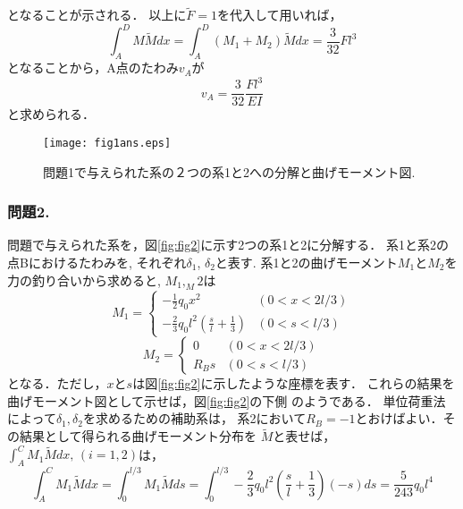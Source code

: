 \documentclass[10pt,a4j]{jarticle}
\begin{document}
となることが示される．
以上に$\tilde F=1$を代入して用いれば，
\begin{equation}
	\int_A^D M\tilde M dx
	=
	\int_A^D (M_1+M_2) \tilde M dx
	=
	\frac{3}{32}Fl^3
\end{equation}
となることから，A点のたわみ$v_A$が
\begin{equation}
	v_A= \frac{3}{32}\frac{Fl^3}{EI}
\end{equation}
と求められる．
\begin{figure}
	\begin{center}
	\texttt{[image: fig1ans.eps]} 
	\end{center}
	\caption{問題1で与えられた系の２つの系1と2への分解と曲げモーメント図. } 
	\label{fig:fig1}
\end{figure}
\subsubsection*{問題2.}
問題で与えられた系を，図\ref{fig:fig2}に示す2つの系1と2に分解する．
系1と系2の点Bにおけるたわみを, それぞれ$\delta_1$, $\delta_2$と表す.
系1と2の曲げモーメント$M_1$と$M_2$を力の釣り合いから求めると, 
$M_1,_M2$は
\begin{equation}
	M_1=\left\{
	\begin{array}{ll}
		-\frac{1}{2}q_0x^2 & (0< x < 2l/3) \\ 
		-\frac{2}{3}q_0l^2 \left(\frac{s}{l}+\frac{1}{3}\right) & (0< s < l/3) 
	\end{array}
	\right.
	\label{eqn:M1_2}
\end{equation}
\begin{equation}
	M_2=\left\{
	\begin{array}{ll}
		0 & (0< x < 2l/3) \\ 
		R_Bs & (0< s < l/3) 
	\end{array}
	\right.
	\label{eqn:M2_2}
\end{equation}
となる．ただし，$x$と$s$は図\ref{fig:fig2}に示したような座標を表す．
これらの結果を曲げモーメント図として示せば，図\ref{fig:fig2}の下側
のようである．
単位荷重法によって$\delta_1,\delta_2$を求めるための補助系は，
系2において$R_B=-1$とおけばよい．その結果として得られる曲げモーメント分布を
$\tilde M$と表せば，$\int_A^C M_1\tilde M dx,\,(i=1,2)$は，
\begin{equation}
	\int_A^CM_1\tilde Mdx=
	\int_0^{l/3}M_1\tilde Mds=
	\int_0^{l/3}
	-\frac{2}{3}q_0l^2\left(\frac{s}{l}+\frac{1}{3}\right)\left(-s\right)ds
	=\frac{5}{243}q_0l^4
\end{equation}
\end{document}
